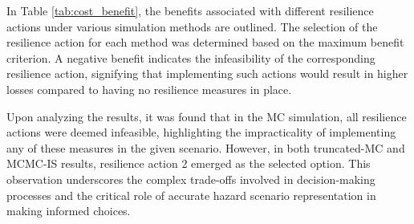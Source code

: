     In Table \ref{tab:cost_benefit}, the benefits associated with different resilience actions under various simulation methods are outlined. The selection of the resilience action for each method was determined based on the maximum benefit criterion. A negative benefit indicates the infeasibility of the corresponding resilience action, signifying that implementing such actions would result in higher losses compared to having no resilience measures in place.
        
    

    Upon analyzing the results, it was found that in the MC simulation, all resilience actions were deemed infeasible, highlighting the impracticality of implementing any of these measures in the given scenario. However, in both truncated-MC and MCMC-IS results, resilience action 2 emerged as the selected option. This observation underscores the complex trade-offs involved in decision-making processes and the critical role of accurate hazard scenario representation in making informed choices.
    